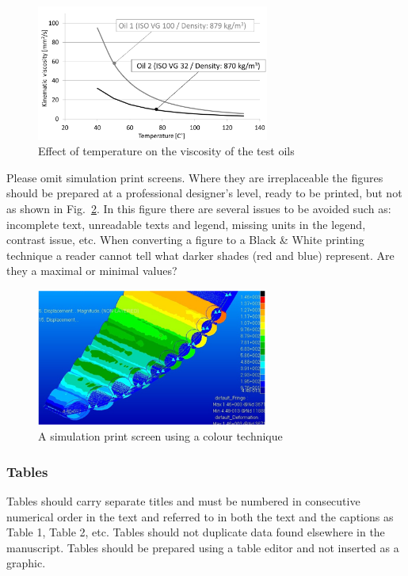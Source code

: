 \documentclass[10pt]{JoME}
\begin{document}
  
\begin{figure}[h]
\includegraphics[width=76.5mm]{fig3.png}
\caption{Effect of temperature on the viscosity of the test oils\label{figC}}
\end{figure}
 
  

Please omit simulation print screens. Where they are irreplaceable the figures should be prepared at a professional designer’s level, ready to be printed, but not as shown in Fig.~\ref{figD}. In this figure there are several issues to be avoided such as: incomplete text, unreadable texts and legend, missing units in the legend, contrast issue, etc. When converting a figure to a Black \& White printing technique a reader cannot tell what darker shades (red and blue) represent. Are they a maximal or minimal values? 

\begin{figure}[h]
\includegraphics[width=76.5mm]{fig4.png}
\caption{A simulation print screen using a colour technique\label{figD}}
\end{figure}


\subsubsection{Tables}

Tables should carry separate titles and must be numbered in consecutive numerical order in the text and referred to in both the text and the captions as Table 1, Table 2, etc. Tables should not duplicate data found elsewhere in the manuscript. Tables should be prepared using a table editor and not inserted as a graphic.
\end{document}
